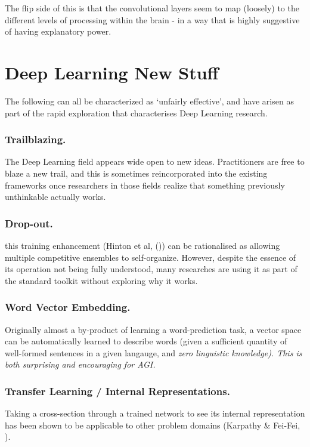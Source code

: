 \documentclass[citeauthoryear]{llncs}
\begin{document}
The flip side of this is that the convolutional layers seem to 
map (loosely) to the different levels of processing within the brain - 
in a way that is highly suggestive of having explanatory power.

 
\section{Deep Learning New Stuff}

The following can all be characterized as `unfairly effective', and have 
arisen as part of the rapid exploration that characterises Deep Learning research.


\subsubsection*{Trailblazing.}
The Deep Learning field appears wide open to new ideas.  
Practitioners are free to blaze a new trail, and this is sometimes 
reincorporated into the existing frameworks once researchers in those 
fields realize that something previously unthinkable actually works.


\subsubsection*{Drop-out.}
this training enhancement (Hinton et al, (\cite{hinton-dropout})) 
can be rationalised as allowing multiple competitive ensembles to self-organize.  
However, despite the essence of its operation not being fully understood, 
many researches are using it as part of the standard toolkit without 
exploring why it works.


\subsubsection*{Word Vector Embedding.}
Originally almost a by-product of learning a word-prediction task, a vector 
space can be automatically learned to describe words (given a sufficient
quantity of well-formed sentences in a given langauge, and \it{zero} linguistic knowledge).
This is both surprising and encouraging for AGI.


\subsubsection*{Transfer Learning / Internal Representations.}
Taking a cross-section through a trained network to see its internal representation
has been shown to be applicable to other problem domains (Karpathy \& Fei-Fei, \cite{karpathy2014deep}).
\end{document}

